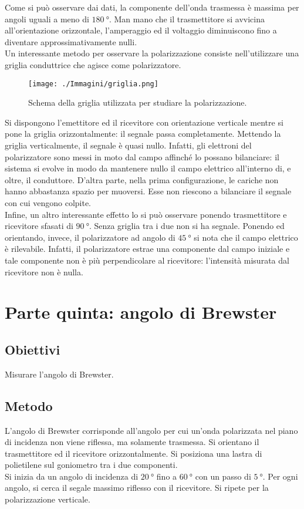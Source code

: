 \documentclass[a4paper]{article}
\begin{document}
Come si può osservare dai dati, la componente dell'onda trasmessa è massima per angoli uguali a meno di $\SI{180}{\degree}$. Man mano che il trasmettitore si avvicina all'orientazione orizzontale, l'amperaggio ed il voltaggio diminuiscono fino a diventare approssimativamente nulli.\\
Un interessante metodo per osservare la polarizzazione consiste nell'utilizzare una griglia conduttrice che agisce come polarizzatore.
\begin{figure}[h]
    \centering
    \texttt{[image: ./Immagini/griglia.png]}
    \caption[Polarizzatore]{Schema della griglia utilizzata per studiare la polarizzazione.}
\end{figure}
Si dispongono l'emettitore ed il ricevitore con orientazione verticale mentre si pone la griglia orizzontalmente: il segnale passa completamente. Mettendo la griglia verticalmente, il segnale è quasi nullo. Infatti, gli elettroni del polarizzatore sono messi in moto dal campo affinché lo possano bilanciare: il sistema si evolve in modo da mantenere nullo il campo elettrico all'interno di, e oltre, il conduttore. D'altra parte, nella prima configurazione, le cariche non hanno abbastanza spazio per muoversi. Esse non riescono a bilanciare il segnale con cui vengono colpite.\\
Infine, un altro interessante effetto lo si può osservare ponendo trasmettitore e ricevitore sfasati di $\SI{90}{\degree}$. Senza griglia tra i due non si ha segnale. Ponendo ed orientando, invece, il polarizzatore ad angolo di $\SI{45}{\degree}$ si nota che il campo elettrico è rilevabile. Infatti, il polarizzatore estrae una componente dal campo iniziale e tale componente non è più perpendicolare al ricevitore: l'intensità misurata dal ricevitore non è nulla.


\clearpage
\section{Parte quinta: angolo di Brewster}
\subsection{Obiettivi}
Misurare l'angolo di Brewster.
\subsection{Metodo}
L'angolo di Brewster corrisponde all'angolo per cui un'onda polarizzata nel piano di incidenza non viene riflessa, ma solamente trasmessa. Si orientano il trasmettitore ed il ricevitore orizzontalmente. Si posiziona una lastra di polietilene sul goniometro tra i due componenti.\\
Si inizia da un angolo di incidenza di $\SI{20}{\degree}$ fino a $\SI{60}{\degree}$ con un passo di $\SI{5}{\degree}$. Per ogni angolo, si cerca il segale massimo riflesso con il ricevitore. Si ripete per la polarizzazione verticale.
\end{document}

